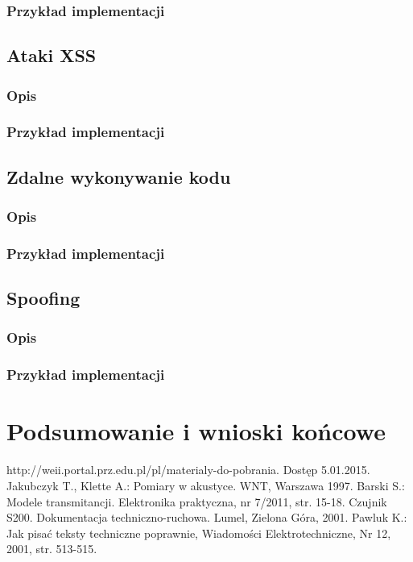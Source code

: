 \documentclass[12pt,twoside]{article}
\begin{document}
\subsubsection{Przykład implementacji}
\subsection{Ataki XSS}
\subsubsection{Opis}
\subsubsection{Przykład implementacji}
\subsection{Zdalne wykonywanie kodu}
\subsubsection{Opis}
\subsubsection{Przykład implementacji}
\subsection{Spoofing}
\subsubsection{Opis}
\subsubsection{Przykład implementacji}
\clearpage
\section{Podsumowanie i wnioski końcowe}



\clearpage


\begin{thebibliography}{4}
 http://weii.portal.prz.edu.pl/pl/materialy-do-pobrania. Dostęp 5.01.2015.
 Jakubczyk T., Klette A.: Pomiary w akustyce. WNT, Warszawa 1997.
 Barski S.: Modele transmitancji. Elektronika praktyczna, nr 7/2011, str. 15-18.
 Czujnik S200. Dokumentacja techniczno-ruchowa. Lumel, Zielona Góra, 2001.
 Pawluk K.: Jak pisać teksty techniczne poprawnie, Wiadomości Elektrotechniczne, Nr 12, 2001, str. 513-515.
\end{thebibliography}

\clearpage

\makesummary
\end{document}
